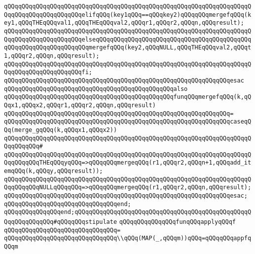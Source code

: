 \verb|qQQqqQQqqQQqqQQqqQQqqQQqqQQqqQQqqQQqqQQqqQQqqQQqqQQqqQQqqQQqqQQqqQQqqQQqqQQqqQQqqQQqqQQqqQQqelifqQQq(key1qQQq==qQQqkey2)qQQqqQQqmergefqQQq(key1,qQQqTHEqQQqval1,qQQqTHEqQQqval2,qQQqr1,qQQqr2,qQQqn,qQQqresult);|\newline
\verb|qQQqqQQqqQQqqQQqqQQqqQQqqQQqqQQqqQQqqQQqqQQqqQQqqQQqqQQqqQQqqQQqqQQqqQQqqQQqqQQqqQQqqQQqqQQqelseqQQqqQQqqQQqqQQqqQQqqQQqqQQqqQQqqQQqqQQqqQQqqQQqqQQqqQQqqQQqqQQqqQQqmergefqQQq(key2,qQQqNULL,qQQqTHEqQQqval2,qQQqt1,qQQqr2,qQQqn,qQQqresult);|\newline
\verb|qQQqqQQqqQQqqQQqqQQqqQQqqQQqqQQqqQQqqQQqqQQqqQQqqQQqqQQqqQQqqQQqqQQqqQQqqQQqqQQqqQQqqQQqqQQqfi;|\newline
\verb|qQQqqQQqqQQqqQQqqQQqqQQqqQQqqQQqqQQqqQQqqQQqqQQqqQQqqQQqqQQqqQQqesac|\newline
\newline
\verb|qQQqqQQqqQQqqQQqqQQqqQQqqQQqqQQqqQQqqQQqqQQqqQQqalso|\newline
\verb|qQQqqQQqqQQqqQQqqQQqqQQqqQQqqQQqqQQqqQQqqQQqqQQqfunqQQqmergefqQQq(k,qQQqx1,qQQqx2,qQQqr1,qQQqr2,qQQqn,qQQqresult)|\newline
\verb|qQQqqQQqqQQqqQQqqQQqqQQqqQQqqQQqqQQqqQQqqQQqqQQqqQQqqQQqqQQqqQQq=|\newline
\verb|qQQqqQQqqQQqqQQqqQQqqQQqqQQqqQQqqQQqqQQqqQQqqQQqqQQqqQQqqQQqqQQqcaseqQQq(merge_gqQQq(k,qQQqx1,qQQqx2))|\newline
\verb|qQQqqQQqqQQqqQQqqQQqqQQqqQQqqQQqqQQqqQQqqQQqqQQqqQQqqQQqqQQqqQQqqQQqqQQqqQQqqQQq#|\newline
\verb|qQQqqQQqqQQqqQQqqQQqqQQqqQQqqQQqqQQqqQQqqQQqqQQqqQQqqQQqqQQqqQQqqQQqqQQqqQQqqQQqTHEqQQqyqQQq=>qQQqqQQqmergeqQQq(r1,qQQqr2,qQQqn+1,qQQqadd_itemqQQq(k,qQQqy,qQQqresult));|\newline
\verb|qQQqqQQqqQQqqQQqqQQqqQQqqQQqqQQqqQQqqQQqqQQqqQQqqQQqqQQqqQQqqQQqqQQqqQQqqQQqqQQqNULLqQQqqQQq=>qQQqqQQqmergeqQQq(r1,qQQqr2,qQQqn,qQQqresult);|\newline
\verb|qQQqqQQqqQQqqQQqqQQqqQQqqQQqqQQqqQQqqQQqqQQqqQQqqQQqqQQqqQQqqQQqesac;|\newline
\verb|qQQqqQQqqQQqqQQqqQQqqQQqqQQqqQQqend;|\newline
\verb|qQQqqQQqqQQqqQQqend;qQQqqQQqqQQqqQQqqQQqqQQqqQQqqQQqqQQqqQQqqQQqqQQqqQQqqQQqqQQqqQQq#qQQqqQQqstipulate|\newline
\newline
\verb|qQQqqQQqqQQqqQQqfunqQQqapplyqQQqf|\newline
\verb|qQQqqQQqqQQqqQQqqQQqqQQqqQQqqQQq=|\newline
\verb|qQQqqQQqqQQqqQQqqQQqqQQqqQQqqQQq\\qQQq(MAP(_,qQQqm))qQQq=qQQqqQQqappfqQQqm|\newline
